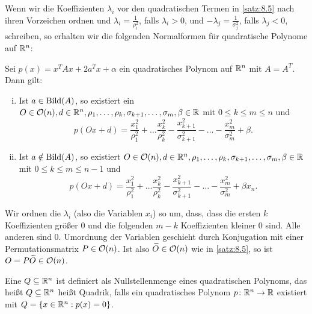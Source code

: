 Wenn wir die Koeffizienten $\lambda_i$ vor den quadratischen Termen in \autoref{satz:8.5} nach ihren Vorzeichen ordnen und $\lambda_i = \frac{1}{\rho_i^2}$, falls $\lambda_i > 0$, und $-\lambda_j = \frac{1}{\sigma_j^2}$, falls $\lambda_j < 0$, schreiben, so erhalten wir die folgenden Normalformen für quadratische Polynome auf $\mathbb{R}^n$:

\begin{satz}
	\label{satz:8.6}
	Sei $p(x) = x^TAx + 2a^Tx + \alpha$ ein quadratisches Polynom auf $\mathbb{R}^n$ mit $A = A^T$.
	Dann gilt:
	\begin{enumerate}[(i)]
		\item Ist $a \in \operatorname{Bild}(A)$, so existiert ein $O \in \mathcal{O}(n), d \in \mathbb{R}^n, \rho_1, \dots, \rho_k, \sigma_{k+1},\dots,\sigma_{m}, \beta \in \mathbb{R}$ mit $0 \leq k \leq m \leq n$ und
		\[
			p(Ox+d) = \frac{x_1^2}{\rho_1^2} + \dots \frac{x_k^2}{\rho_k^2} - \frac{x_{k+1}^2}{\sigma_{k+1}^2} - \dots - \frac{x_m^2}{\sigma_m^2} + \beta.
		\]
		\item Ist $a \notin \operatorname{Bild}(A)$, so existiert $O \in \mathcal{O}(n), d \in \mathbb{R}^n, \rho_1, \dots, \rho_k, \sigma_{k+1},\dots,\sigma_m,\beta \in \mathbb{R}$ mit $0 \leq k \leq m \leq n-1$ und
		\[
		p(Ox+d) = \frac{x_1^2}{\rho_1^2} + \dots \frac{x_k^2}{\rho_k^2} - \frac{x_{k+1}^2}{\sigma_{k+1}^2} - \dots - \frac{x_m^2}{\sigma_m^2} + \beta x_n.
		\]
	\end{enumerate}
\end{satz}

\begin{beweis}
	Wir ordnen die $\lambda_i$ (also die Variablen $x_i$) so um, dass, dass die ersten $k$ Koeffizienten größer $0$ und die folgenden $m-k$ Koeffizienten kleiner $0$ sind.
	Alle anderen sind $0$.
	Umordnung der Variablen geschieht durch Konjugation mit einer Permutationsmatrix $P \in \mathcal{O}(n)$.
	Ist also $\widetilde{O} \in \mathcal{O}(n)$ wie in \autoref{satz:8.5}, so ist $O = P\widetilde{O} \in \mathcal{O}(n)$. \qedhere
\end{beweis}
\newpage
\begin{definition}[Quadrik]
	\label{def:8.7}
	Eine  $Q \subseteq \mathbb{R}^n$ ist definiert als Nullstellenmenge eines quadratischen Polynoms, das heißt $Q \subseteq \mathbb{R}^n$ heißt Quadrik, falls ein quadratisches Polynom $p \colon \mathbb{R}^n \rightarrow \mathbb{R}$ existiert mit $Q = \{x \in \mathbb{R}^n : p(x) = 0\}$.
\end{definition}


